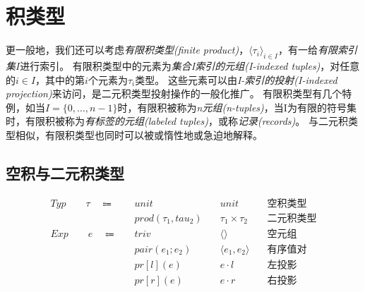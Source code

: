 \chapter{积类型}


更一般地，我们还可以考虑\textit{有限积类型(finite product)}，$\langle\tau_i \rangle_{i\in I}$，有一给\textit{有限索引集}$I$进行索引。
有限积类型中的元素为\textit{集合I索引的元组(I-indexed tuples)}，对任意的$i\in I$，其中的第$i$个元素为$\tau_i$类型。
这些元素可以由\textit{I-索引的投射(I-indexed projection)}来访问，是二元积类型投射操作的一般化推广。
有限积类型有几个特例，如当$I = \{ 0, \dots, n-1\}$时，有限积被称为\textit{n元组(n-tuples)}，当I为有限的符号集时，有限积被称为\textit{有标签的元组(labeled tuples)}，或称\textit{记录(records)}。
与二元积类型相似，有限积类型也同时可以被或惰性地或急迫地解释。


\section{空积与二元积类型}
\begin{equation*}
\begin{aligned}
Typ \qquad \tau \quad \Coloneqq \quad &unit\quad &unit \quad &\mbox{空积类型}
\\
&prod(\tau_1, tau_2) \quad &\tau_1 \times \tau_2 \quad &\mbox{二元积类型}
\\
Exp \qquad e \quad \Coloneqq \quad &triv \quad &\langle \rangle \quad &\mbox{空元组}
\\
&pair(e_1; e_2) \quad &\langle e_1,e_2 \rangle \quad &\mbox{有序值对}
\\
&pr[l](e) \quad &e \cdot l \quad &\mbox{左投影}
\\
&pr[r](e) \quad &e \cdot r \quad &\mbox{右投影}
\end{aligned}
\end{equation*}

